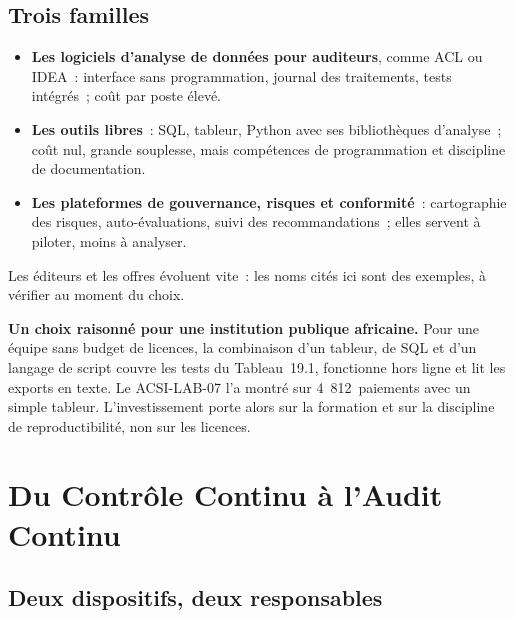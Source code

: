 \subsection{Trois familles}

\begin{itemize}
    \item \textbf{Les logiciels d'analyse de données pour auditeurs}, comme
          ACL ou IDEA~: interface sans programmation, journal des
          traitements, tests intégrés~; coût par poste élevé.
    \item \textbf{Les outils libres}~: SQL, tableur, Python avec ses
          bibliothèques d'analyse~; coût nul, grande souplesse, mais
          compétences de programmation et discipline de documentation.
    \item \textbf{Les plateformes de gouvernance, risques et conformité}~:
          cartographie des risques, auto-évaluations, suivi des
          recommandations~; elles servent à piloter, moins à analyser.
\end{itemize}
Les éditeurs et les offres évoluent vite~: les noms cités ici sont des
exemples, à vérifier au moment du choix.

\begin{boxinfo}
\textbf{Un choix raisonné pour une institution publique africaine.} Pour
une équipe sans budget de licences, la combinaison d'un tableur, de SQL et
d'un langage de script couvre les tests du Tableau~19.1, fonctionne hors
ligne et lit les exports en texte. Le ACSI-LAB-07 l'a montré sur
4~812~paiements avec un simple tableur. L'investissement porte alors sur la
formation et sur la discipline de reproductibilité, non sur les licences.
\end{boxinfo}

\section{Du Contrôle Continu à l'Audit Continu}
\label{sec:c19-continu}

\subsection{Deux dispositifs, deux responsables}

